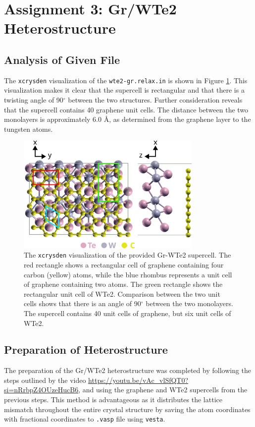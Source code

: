 \documentclass[10pt,a4paper]{labreport}
\begin{document}
\newpage 
\section{Assignment 3: Gr/WTe2 Heterostructure}
\subsection{Analysis of Given File}
The \texttt{xcrysden} visualization of the \texttt{wte2-gr.relax.in} is shown in Figure \ref{fig:ass3_struct1}. This visualization makes it clear that the supercell is rectangular and that there is a twisting angle of 90$^\circ$ between the two structures. Further consideration reveals that the supercell contains 40 graphene unit cells. The distance between the two monolayers is approximately 6.0 \AA, as determined from the graphene layer to the tungsten atoms.   

\begin{figure}[h!]
  \centering 
  \includegraphics[width = 0.8\textwidth]{figs/gr-wte2_struct.png}
  \caption{The \texttt{xcrysden} visualization of the provided Gr-WTe2 supercell. The red rectangle shows a rectangular cell of graphene containing four carbon (yellow) atoms, while the blue rhombus represents a unit cell of graphene containing two atoms. The green rectangle shows the rectangular unit cell of WTe2. Comparison between the two unit cells shows that there is an angle of 90$^\circ$ between the two monolayers. The supercell contains 40 unit cells of graphene, but six unit cells of WTe2. }
  \label{fig:ass3_struct1}
\end{figure}



\subsection{Preparation of Heterostructure}
The preparation of the Gr/WTe2 heterostructure was completed by following the steps outlined by the video \url{https://youtu.be/vAc_vlSfQT0?si=nRrbpZ4OUzeHucB6}, and using the graphene and WTe2 supercells from the previous steps. This method is advantageous as it distributes the lattice mismatch throughout the entire crystal structure by saving the atom coordinates with fractional coordinates to \texttt{.vasp} file using \texttt{vesta}. 
\end{document}
